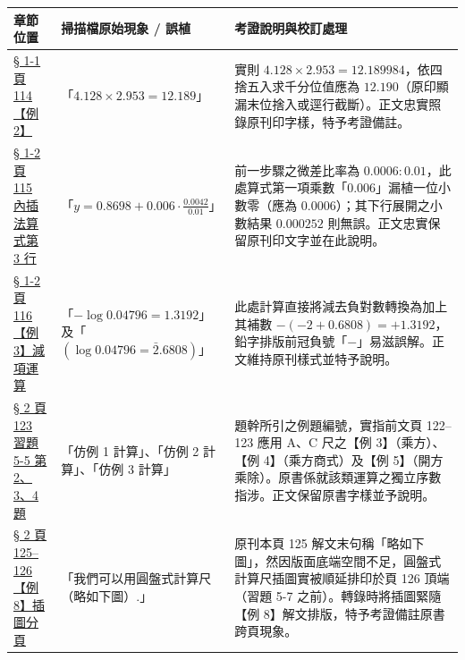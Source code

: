 \documentclass[a4paper,12pt,twoside]{article}
\begin{document}
\begin{table}[H]
\centering
\small
\renewcommand{\arraystretch}{1.35}
\begin{tabularx}{\textwidth}{|p{3.2cm}|p{3.6cm}|X|}
\hline
\textbf{章節位置} & \textbf{掃描檔原始現象 / 誤植} & \textbf{考證說明與校訂處理} \\ \hline

\hyperref[note:b2-ch5-p114-ex2]{§ 1-1 頁 114 【例 2】} & 
「$4.128 \times 2.953 = 12.189$」 & 
實則 $4.128 \times 2.953 = 12.189984$，依四捨五入求千分位值應為 $12.190$（原印顯漏末位捨入或逕行截斷）。正文忠實照錄原刊印字樣，特予考證備註。 \\ \hline

\hyperref[note:b2-ch5-p115-interpolation-zero]{§ 1-2 頁 115 內插法算式第 3 行} & 
「$y = 0.8698 + 0.006 \cdot \frac{0.0042}{0.01}$」 & 
前一步驟之微差比率為 $0.0006 : 0.01$，此處算式第一項乘數「$0.006$」漏植一位小數零（應為 $0.0006$）；其下行展開之小數結果 $0.000252$ 則無誤。正文忠實保留原刊印文字並在此說明。 \\ \hline

\hyperref[note:b2-ch5-p116-ex3-minus-log]{§ 1-2 頁 116 【例 3】減項運算} & 
「$-\log 0.04796 = 1.3192$」及「$(\log 0.04796 = \bar{2}.6808)$」 & 
此處計算直接將減去負對數轉換為加上其補數 $-( -2 + 0.6808) = + 1.3192$，鉛字排版前冠負號「$-$」易滋誤解。正文維持原刊樣式並特予說明。 \\ \hline

\hyperref[note:b2-ch5-p123-ex5-5-ref]{§ 2 頁 123 習題 5-5 第 2、3、4 題} & 
「仿例 1 計算」、「仿例 2 計算」、「仿例 3 計算」 & 
題幹所引之例題編號，實指前文頁 122–123 應用 A、C 尺之【例 3】（乘方）、【例 4】（乘方商式）及【例 5】（開方乘除）。原書係就該類運算之獨立序數指涉。正文保留原書字樣並予說明。 \\ \hline

\hyperref[note:b2-ch5-p125-circular-rule-split]{§ 2 頁 125–126 【例 8】插圖分頁} & 
「我們可以用圓盤式計算尺（略如下圖）.」 & 
原刊本頁 125 解文末句稱「略如下圖」，然因版面底端空間不足，圓盤式計算尺插圖實被順延排印於頁 126 頂端（習題 5-7 之前）。轉錄時將插圖緊隨【例 8】解文排版，特予考證備註原書跨頁現象。 \\ \hline

\end{tabularx}
\end{table}

\clearpage
\tableofcontents
\newpage


\end{document}
